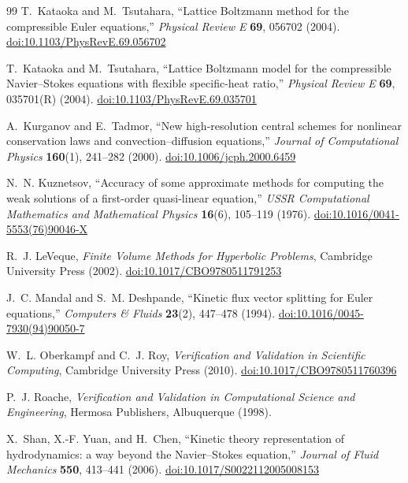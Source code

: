 \documentclass[11pt]{article}
\theoremstyle{remark}
\begin{document}
\begin{thebibliography}{99}
T.~Kataoka and M.~Tsutahara,
``Lattice Boltzmann method for the compressible Euler equations,''
\emph{Physical Review E} \textbf{69}, 056702 (2004).
\href{https://doi.org/10.1103/PhysRevE.69.056702}{doi:10.1103/PhysRevE.69.056702}

T.~Kataoka and M.~Tsutahara,
``Lattice Boltzmann model for the compressible Navier--Stokes equations with flexible specific-heat ratio,''
\emph{Physical Review E} \textbf{69}, 035701(R) (2004).
\href{https://doi.org/10.1103/PhysRevE.69.035701}{doi:10.1103/PhysRevE.69.035701}

A.~Kurganov and E.~Tadmor,
``New high-resolution central schemes for nonlinear conservation laws and convection--diffusion equations,''
\emph{Journal of Computational Physics} \textbf{160}(1), 241--282 (2000).
\href{https://doi.org/10.1006/jcph.2000.6459}{doi:10.1006/jcph.2000.6459}

N.~N. Kuznetsov,
``Accuracy of some approximate methods for computing the weak solutions of a first-order quasi-linear equation,''
\emph{USSR Computational Mathematics and Mathematical Physics} \textbf{16}(6), 105--119 (1976).
\href{https://doi.org/10.1016/0041-5553(76)90046-X}{doi:10.1016/0041-5553(76)90046-X}

R.~J. LeVeque,
\emph{Finite Volume Methods for Hyperbolic Problems},
Cambridge University Press (2002).
\href{https://doi.org/10.1017/CBO9780511791253}{doi:10.1017/CBO9780511791253}

J.~C. Mandal and S.~M. Deshpande,
``Kinetic flux vector splitting for Euler equations,''
\emph{Computers \& Fluids} \textbf{23}(2), 447--478 (1994).
\href{https://doi.org/10.1016/0045-7930(94)90050-7}{doi:10.1016/0045-7930(94)90050-7}

W.~L. Oberkampf and C.~J. Roy,
\emph{Verification and Validation in Scientific Computing},
Cambridge University Press (2010).
\href{https://doi.org/10.1017/CBO9780511760396}{doi:10.1017/CBO9780511760396}

P.~J. Roache,
\emph{Verification and Validation in Computational Science and Engineering},
Hermosa Publishers, Albuquerque (1998).

X.~Shan, X.-F. Yuan, and H.~Chen,
``Kinetic theory representation of hydrodynamics: a way beyond the Navier--Stokes equation,''
\emph{Journal of Fluid Mechanics} \textbf{550}, 413--441 (2006).
\href{https://doi.org/10.1017/S0022112005008153}{doi:10.1017/S0022112005008153}


\end{thebibliography}
\end{document}
